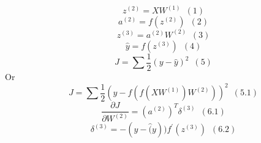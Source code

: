 \documentclass[]{article}
\begin{document}
	\begin{equation*}
			\quad z ^{(2)} = X  W ^{(1)} \,\,\,(1)
	\end{equation*}
	\begin{equation*}
		\quad a ^{(2)} = f(z ^{(2)}) \,\,\,(2)
		\end{equation*}
	\begin{equation*}
		\quad z ^{(3)} = a ^{(2)}  W ^{(2)} \,\,\,(3)
	\end{equation*}
	\begin{equation*}
		\quad \hat{y} = f(z ^{(3)}) \,\,\,(4)
	\end{equation*}
	\begin{equation*}
		\quad J = \sum \frac{1}{2}(y - \hat{y})^{2} \,\,\,(5)
	\end{equation*}
	\centering Or 
	\begin{equation*}
		\quad J = \sum \frac{1}{2}(y - f(f(XW ^{(1)})W ^{(2)}))^{2} \,\,\,(5.1)
	\end{equation*}
	\begin{equation*}
		\quad  \frac{\partial J}{\partial W^{(2)}} = (a ^{(2)})^{T} \delta ^{(3)}\,\,\,(6.1)
	\end{equation*}
	\begin{equation*}
		\quad \delta ^{(3)} = -(y - \hat(y))f^{\prime} (z^{(3)}) \,\,\,(6.2)
	\end{equation*}
	
\end{document}
